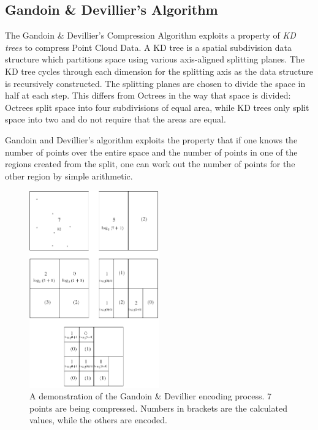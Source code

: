 \documentclass[a4paper,11pt]{report}
\begin{document}
\subsection{Gandoin \& Devillier's Algorithm}
\label{gdkdtree}
The Gandoin \& Devillier's Compression Algorithm\cite{devillers2000gci} exploits a property of \emph{KD trees}\cite{moore1991intoductory} to compress Point Cloud Data. A KD tree is a spatial subdivision data structure which partitions space using various axis-aligned splitting planes. The KD tree cycles through each dimension for the splitting axis as the data structure is recursively constructed. The splitting planes are chosen to divide the space in half at each step. This differs from Octrees in the way that space is divided: Octrees split space into four subdivisions of equal area, while KD trees only split space into two and do not require that the areas are equal.

Gandoin and Devillier's algorithm exploits the property that if one knows the number of points over the entire space and the number of points in one of the regions created from the split, one can work out the number of points for the other region by simple arithmetic.

\begin{figure}[!h]
 \center
 \includegraphics[width=0.5\textwidth]{resources/GaD.png}
\caption{A demonstration of the Gandoin \& Devillier encoding process. 7 points are being compressed. Numbers in brackets are the calculated values, while the others are encoded. \cite{devillers2000gci}}
\label{octree}
\end{figure}
\end{document}
